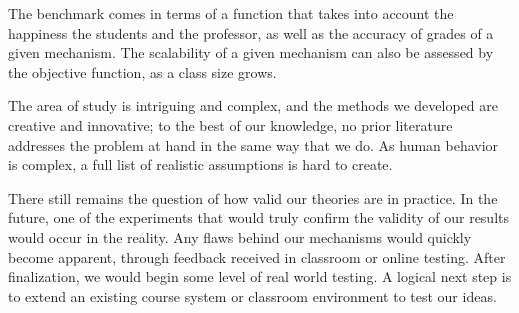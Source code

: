 \documentclass[12pt, Arial]{article}
\begin{document}
The benchmark comes in terms of a function that takes into account the happiness the students and the professor, as well as the accuracy of grades of a given mechanism. The scalability of a given mechanism can also be assessed by the objective function, as a class size grows.

The area of study is intriguing and complex, and the methods we developed are creative and innovative; to the best of our knowledge, no prior literature addresses the problem at hand in the same way that we do. As human behavior is complex, a full list of realistic assumptions is hard to create.  

There still remains the question of how valid our theories are in practice. In the future, one of the experiments that would truly confirm the validity of our results would occur in the reality. Any flaws behind our mechanisms would quickly become apparent, through feedback received in classroom or online testing. After finalization, we would begin some level of real world testing. A logical next step is to extend an existing course system or classroom environment to test our ideas.

\newpage
{}

\end{document}
